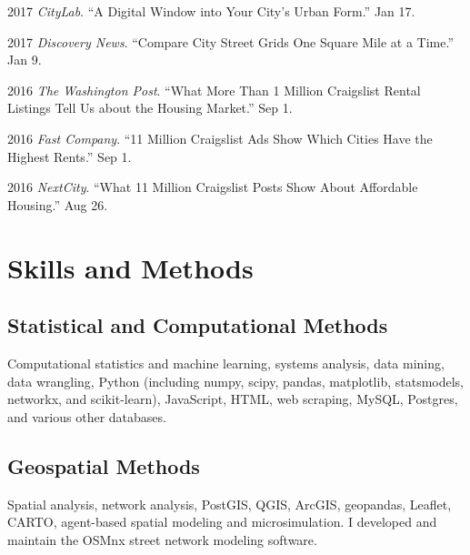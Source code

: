 \documentclass[12pt,letterpaper]{report}
\newcommand{\listitemspace}{0.15em}
\renewenvironment{itemize}
{\begin{list}{}{\setlength{\leftmargin}{0em}
			\setlength{\parskip}{0em}
			\setlength{\itemsep}{\listitemspace}
			\setlength{\parsep}{\listitemspace}}}
	{\end{list}}
\begin{document}
\begin{tablist}
\begin{tablist}
		\item 2017 \tab \textit{CityLab}. \enquote{A Digital Window into Your City's Urban Form.} Jan 17.
		
		\item 2017 \tab \textit{Discovery News}. \enquote{Compare City Street Grids One Square Mile at a Time.} Jan 9.
		
		\item 2016 \tab \textit{The Washington Post}. \enquote{What More Than 1 Million Craigslist Rental Listings Tell Us about the Housing Market.} Sep 1.
		
		\item 2016 \tab \textit{Fast Company}. \enquote{11 Million Craigslist Ads Show Which Cities Have the Highest Rents.} Sep 1.
		
		\item 2016 \tab \textit{NextCity}. \enquote{What 11 Million Craigslist Posts Show About Affordable Housing.} Aug 26.
		
	\end{tablist}
	
	
	
	\section*{Skills and Methods}
	
	\subsection*{Statistical and Computational Methods}
	
	\begin{itemize}
		
		\item Computational statistics and machine learning, systems analysis, data mining, data wrangling, Python (including numpy, scipy, pandas, matplotlib, statsmodels, networkx, and scikit-learn), JavaScript, HTML, web scraping, MySQL, Postgres, and various other databases.
		
	\end{itemize}
	
	\subsection*{Geospatial Methods}
	
	\begin{itemize}
		
		\item Spatial analysis, network analysis, PostGIS, QGIS, ArcGIS, geopandas, Leaflet, CARTO, agent-based spatial modeling and microsimulation. I developed and maintain the OSMnx street network modeling software.
		

\end{itemize}
\end{tablist}
\end{document}
